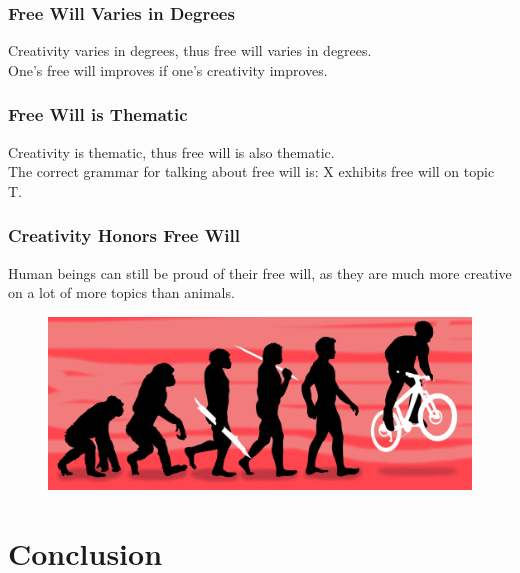 \documentclass[xcolor=dvipsnames]{beamer}
\theoremstyle{definition}
\begin{document}
\begin{frame}[fragile]
  \frametitle{Free Will Varies in Degrees}

  Creativity varies in degrees, thus free will \alert{varies in degrees}.\\[0.5cm]

  One's free will improves if one's creativity improves.
\end{frame}

\begin{frame}[fragile]
  \frametitle{Free Will is Thematic}

  Creativity is thematic, thus free will is also \alert{thematic}.\\[0.5cm]

  The correct grammar for talking about free will is: \alert{X exhibits free will on topic T}.
\end{frame}

\begin{frame}[fragile]
  \frametitle{Creativity Honors Free Will}

  Human beings can still be proud of their free will, as they are much more creative on a lot of more topics than animals.

  \begin{figure}
    \centering
    \includegraphics[width=1\textwidth]{images/degrees.jpg}
  \end{figure}
\end{frame}



\section{Conclusion} %
\label{sec:conclusion}
\end{document}
